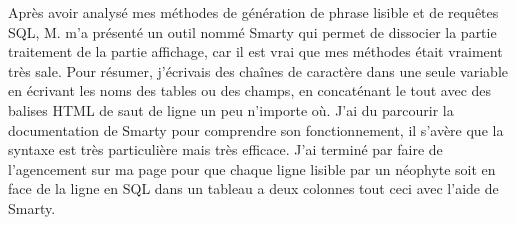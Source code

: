 Après avoir analysé mes méthodes de génération de phrase lisible et de
requêtes SQL, M. m'a présenté un outil nommé \og Smarty \fg{} qui
permet de dissocier la partie traitement de la partie affichage, car il est
vrai que mes méthodes était vraiment très sale. Pour résumer, j'écrivais des
chaînes de caractère dans une seule variable en écrivant les noms des tables ou
des champs, en concaténant le tout avec des balises HTML de saut de ligne un
peu n'importe où. J'ai du parcourir la documentation de Smarty pour comprendre
son fonctionnement, il s'avère que la syntaxe est très particulière mais très
efficace. J'ai terminé par faire de l'agencement sur ma page pour que chaque
ligne lisible par un néophyte soit en face de la ligne en SQL dans un tableau a
deux colonnes tout ceci avec l'aide de Smarty.

\clearpage
